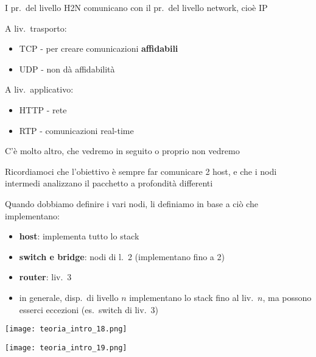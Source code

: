 I pr.~del livello H2N comunicano con il pr.~del livello network, cio\`e IP

\begin{multicols}{2}
A liv.~trasporto:
\begin{itemize}
  \item TCP - per creare comunicazioni \textbf{affidabili}
  \item UDP - non d\`a affidabilit\`a
\end{itemize}

A liv.~applicativo:
\begin{itemize}
  \item HTTP - rete
  \item RTP - comunicazioni real-time
\end{itemize}
\end{multicols}

\begin{emphasize}
    C'\`e molto altro, che vedremo in seguito o proprio non vedremo
  \end{emphasize}
  \vspace{-10pt}
\begin{emphasize-blue}
    Ricordiamoci che l'obiettivo \`e sempre far comunicare 2 host, e che i nodi intermedi analizzano il pacchetto a profondit\`a differenti
\end{emphasize-blue}

Quando dobbiamo definire i vari nodi, li definiamo in base a ci\`o che implementano:
\begin{itemize}
  \item \textbf{host}: implementa tutto lo stack
  \item \textbf{switch e bridge}: nodi di l.~2 (implementano fino a 2)
  \item \textbf{router}: liv.~3
  \item in generale, disp.~di livello $n$ implementano lo stack fino al liv.~$n$, ma possono esserci eccezioni (es.~switch di liv.~3)
\end{itemize}

\noindent\begin{minipage}[t]{.5\textwidth}
\texttt{[image: teoria\_intro\_18.png]}
\end{minipage}
\begin{minipage}[t]{.5\textwidth}
\texttt{[image: teoria\_intro\_19.png]}
\end{minipage}


